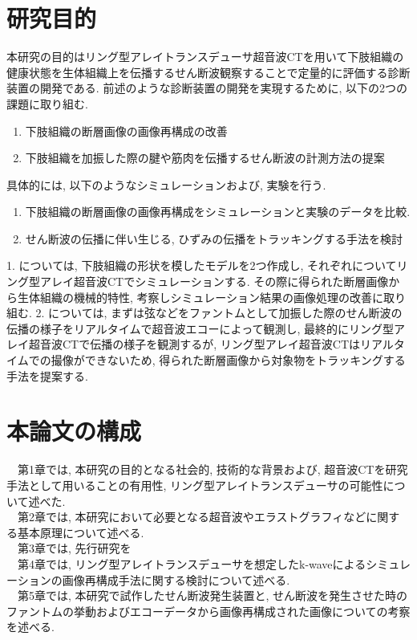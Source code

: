 \section{研究目的}
本研究の目的はリング型アレイトランスデューサ超音波CTを用いて下肢組織の健康状態を生体組織上を伝播するせん断波観察することで定量的に評価する診断装置の開発である. 前述のような診断装置の開発を実現するために, 以下の2つの課題に取り組む. 
\begin{enumerate}
   \item 下肢組織の断層画像の画像再構成の改善
   \item 下肢組織を加振した際の腱や筋肉を伝播するせん断波の計測方法の提案
\end{enumerate}
具体的には, 以下のようなシミュレーションおよび, 実験を行う.
\begin{enumerate}
   \item 下肢組織の断層画像の画像再構成をシミュレーションと実験のデータを比較.
   \item せん断波の伝播に伴い生じる, ひずみの伝播をトラッキングする手法を検討
\end{enumerate}
1. については, 下肢組織の形状を模したモデルを2つ作成し, それぞれについてリング型アレイ超音波CTでシミュレーションする. その際に得られた断層画像から生体組織の機械的特性, 考察しシミュレーション結果の画像処理の改善に取り組む. 2. については, まずは弦などをファントムとして加振した際のせん断波の伝播の様子をリアルタイムで超音波エコーによって観測し, 最終的にリング型アレイ超音波CTで伝播の様子を観測するが, リング型アレイ超音波CTはリアルタイムでの撮像ができないため, 得られた断層画像から対象物をトラッキングする手法を提案する. 

\section{本論文の構成}
　第1章では, 本研究の目的となる社会的, 技術的な背景および, 超音波CTを研究手法として用いることの有用性, リング型アレイトランスデューサの可能性について述べた.
\\\ \ 第2章では, 本研究において必要となる超音波やエラストグラフィなどに関する基本原理について述べる.
\\\ \ 第3章では, 先行研究を
\\\ \ 第4章では, リング型アレイトランスデューサを想定したk-waveによるシミュレーションの画像再構成手法に関する検討について述べる.
\\\ \ 第5章では, 本研究で試作したせん断波発生装置と, せん断波を発生させた時のファントムの挙動およびエコーデータから画像再構成された画像についての考察を述べる.






